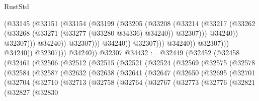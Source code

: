 \begin{lexlean}{RustStd}
\begin{coremodule}
                                            (@33145
                                              (@33151
                                                (@33154
                                                  (@33199
                                                    (@33205
                                                      (@33208
                                                        (@33214
                                                          (@33217
                                                            (@33262
                                                              (@33268
                                                                (@33271
                                                                  (@33277 (@33280 @34336) @34240))
                                                                @32307)))
                                                          @34240))
                                                      @32307)))
                                                @34240))
                                            @32307)))
                                      @34240))
                                  @32307)))
                            @34240))
                        @32307)))
                  @34240))
              @32307)))
        @34240))
    @32307
@34432 := @32449
    (@32452
      (@32458
        (@32461
          (@32506
            (@32512
              (@32515
                (@32521
                  (@32524
                    (@32569
                      (@32575
                        (@32578
                          (@32584
                            (@32587
                              (@32632
                                (@32638
                                  (@32641
                                    (@32647
                                      (@32650
                                        (@32695
                                          (@32701
                                            (@32704
                                              (@32710
                                                (@32713
                                                  (@32758
                                                    (@32764
                                                      (@32767
                                                        (@32773
                                                          (@32776
                                                            (@32821
                                                              (@32827
                                                                (@32830

\end{coremodule}
\end{lexlean}
